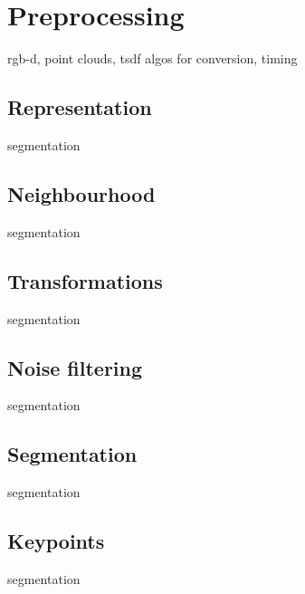 \chapter{Preprocessing}
\label{cha:preprocessing}

rgb-d, point clouds, tsdf
algos for conversion, timing


\section{Representation}
\label{sec:representation}

segmentation


\section{Neighbourhood}
\label{sec:neighbourhood}

segmentation



\section{Transformations}
\label{sec:transformations}

segmentation



\section{Noise filtering}
\label{sec:segmentation}

segmentation



\section{Segmentation}
\label{sec:segmentation}

segmentation


\section{Keypoints}
\label{sec:keypoints}

segmentation

